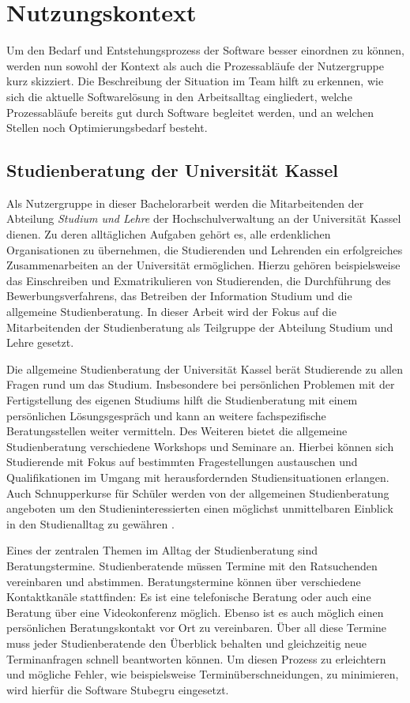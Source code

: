 \chapter{Nutzungskontext}
\label{chapter:user-context}

Um den Bedarf und Entstehungsprozess der Software besser einordnen zu können,
werden nun sowohl der Kontext als auch die Prozessabläufe der Nutzergruppe kurz
skizziert. Die Beschreibung der Situation im Team hilft zu erkennen, wie sich
die aktuelle Softwarelösung in den Arbeitsalltag eingliedert, welche
Prozessabläufe bereits gut durch Software begleitet werden, und an welchen
Stellen noch Optimierungsbedarf besteht.

\section{Studienberatung der Universität Kassel}
Als Nutzergruppe in dieser Bachelorarbeit werden die Mitarbeitenden der
Abteilung \textit{Studium und Lehre} der Hochschulverwaltung an der Universität
Kassel dienen. Zu deren alltäglichen Aufgaben gehört es, alle erdenklichen
Organisationen zu übernehmen, die Studierenden und Lehrenden ein erfolgreiches
Zusammenarbeiten an der Universität ermöglichen. Hierzu gehören beispielsweise
das Einschreiben und Exmatrikulieren von Studierenden, die Durchführung des
Bewerbungsverfahrens, das Betreiben der Information Studium und die allgemeine
Studienberatung. In dieser Arbeit wird der Fokus auf die Mitarbeitenden der
Studienberatung als Teilgruppe der Abteilung Studium und Lehre gesetzt.

Die allgemeine Studienberatung der Universität Kassel berät Studierende zu
allen Fragen rund um das Studium. Insbesondere bei persönlichen Problemen mit
der Fertigstellung des eigenen Studiums hilft die Studienberatung mit einem
persönlichen Lösungsgespräch und kann an weitere fachspezifische
Beratungsstellen weiter vermitteln. Des Weiteren bietet die allgemeine
Studienberatung verschiedene Workshops und Seminare an. Hierbei können sich
Studierende mit Fokus auf bestimmten Fragestellungen austauschen und
Qualifikationen im Umgang mit herausfordernden Studiensituationen erlangen.
Auch Schnupperkurse für Schüler werden von der allgemeinen Studienberatung
angeboten um den Studieninteressierten einen möglichst unmittelbaren Einblick
in den Studienalltag zu gewähren \cite{studBeratungKsWeb}.

Eines der zentralen Themen im Alltag der Studienberatung sind Beratungstermine.
Studienberatende müssen Termine mit den Ratsuchenden vereinbaren und abstimmen.
Beratungstermine können über verschiedene Kontaktkanäle stattfinden: Es ist
eine telefonische Beratung oder auch eine Beratung über eine Videokonferenz
möglich. Ebenso ist es auch möglich einen persönlichen Beratungskontakt vor Ort
zu vereinbaren. Über all diese Termine muss jeder Studienberatende den
Überblick behalten und gleichzeitig neue Terminanfragen schnell beantworten
können. Um diesen Prozess zu erleichtern und mögliche Fehler, wie
beispielsweise Terminüberschneidungen, zu minimieren, wird hierfür die Software
\gls{Stubegru} eingesetzt.

